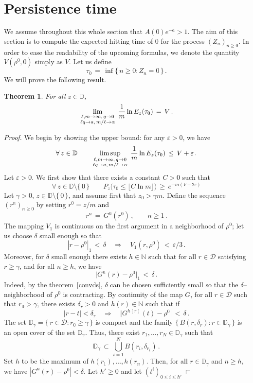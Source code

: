 \documentclass[a4paper,12pt]{article}
\newtheorem{theorem}{Theorem}[section]
\theoremstyle{definition}
\theoremstyle{remark}
\def \cD {\mathcal{D}}
\def \a {\alpha}
\def \g {\gamma}
\def \d {\delta}
\def \e {\varepsilon}
\def \dD {\mathbb{D}}
\def \N {\mathbb{N}}
\def \Lra {\Longrightarrow}
\def \exa {e^{-a}}
\begin{document}
\section{Persistence time}\label{Pertime}
We assume throughout this whole section that $A(0)\exa>1$.
The aim of this section is to compute the expected hitting time of $0$
for the process $(Z_n)_{n\geq0}$.
In order to ease the readability of the upcoming formulas,
we denote the quantity $V(\rho^0,0)$ simply as $V$.
Let us define 
$$\tau_0\,=\,\inf\big\lbrace\,n\geq0:Z_n=0\,\big\rbrace\,.$$
We will prove the following result.
\begin{theorem} For all $z\in\dD$,
$$\lim_{\genfrac{}{}{0pt}{1}{\ell,m\to\infty,\,q\to0}{\ell q\to a,\,m/\ell\to\a}}\,
\frac{1}{m}\ln E_z(\tau_0)\,=\,V\,.$$
\end{theorem}
\begin{proof}
We begin by showing the upper bound: 
for any $\e>0$, we have 
$$\forall\,z\in\dD\qquad\limsup_{\genfrac{}{}{0pt}{1}{\ell,m\to\infty,\,q\to0}{\ell q\to a,\,m/\ell\to\a}}\,
\frac{1}{m}\ln E_z(\tau_0)\,\leq\,V+\e\,.$$
Let $\e>0$.
We first show that there exists a constant 
$C>0$
such that 
$$\forall\,z\in\dD\setminus\lbrace\,0\,\rbrace\qquad
P_z\big(\tau_0\leq \lfloor C\ln m\rfloor\big)
\,\geq\,e^{-m(V+2\e)}$$
Let $\g>0$, $z\in\dD\setminus\lbrace\,0\,\rbrace$,
and assume first that $z_0>\g m$.
Define the sequence $(r^n)_{n\geq0}$ by setting
$r^0=z/m$ and
$$r^n\,=\,G^n(r^0)\,,\qquad n\geq1\,.$$
The mapping $V_1$ is continuous on the first argument
in a neighborhood of $\rho^0$;
let us choose $\d$ small enough so that 
$$|r-\rho^0|_1\,<\,\d\quad\Rightarrow\quad
V_1(r,\rho^0)\,<\,\e/3\,.$$
Moreover, for $\d$ small enough
there exists $h\in\N$ such that for all $r\in\cD$ satisfying $r\geq \g$,
and for all $n\geq h$, we have
$$\big|G^n(r)-\rho^0\big|_1\,<\,\d\,.$$
Indeed, by the theorem~\ref{convds}, $\d$ can be chosen sufficiently small so 
that the {$\d$--neighborhood} of $\rho^0$ is contracting.
By continuity of the map $G$,
for all $r\in\cD$ such that $r_0>\g$,
there exists $\d_r>0$ and $h(r)\in\N$ such that if 
$$|r-t|<\d_r\quad\Lra\quad \big|G^{h(r)}(t)-\rho^0\big|\,<\,\d\,.$$
The set $\dD_\g=\lbrace\,r\in\cD:r_0\geq \g\,\rbrace$ is compact and the family
$\lbrace\,B(r,\d_r):r\in\dD_\g\,\rbrace$
is an open cover of the set $\dD_\g$.
Thus,
there exist $r_1,\dots,r_N\in\dD_\g$
such that
$$\dD_\g\,\subset\,\bigcup_{i=1}^N B(r_i,\d_{r_i})\,.$$
Set
$h$ to be the maximum of $h(r_1),\dots,h(r_n)$.
Then, for all $r\in\dD_\g$ and $n\geq h$,
we have $|G^n(r)-\rho^0|<\d$.
Let $h'\geq 0$ and let $(t^i)_{0\leq i\leq h'}$

\end{proof}
\end{document}
